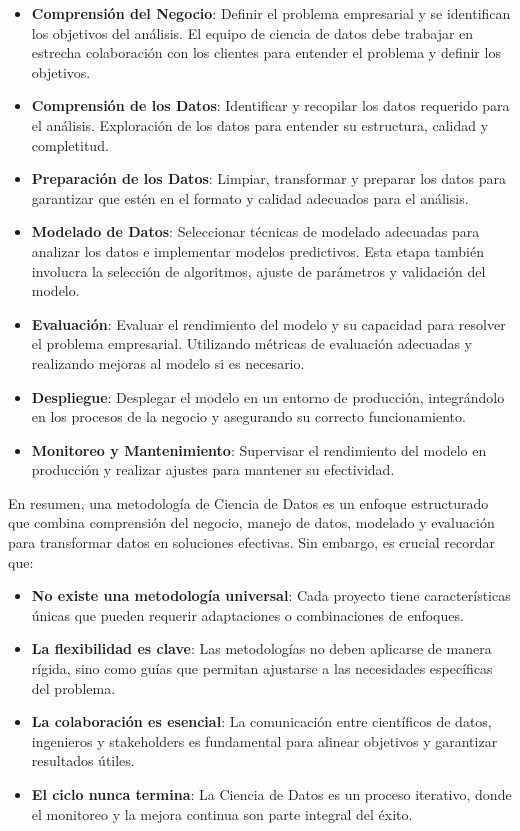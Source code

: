 \documentclass[12pt]{book}
\begin{document}
\begin{itemize}
    \item \textbf{Comprensión del Negocio}: Definir el problema empresarial y se identifican los objetivos del análisis. El equipo de ciencia de datos debe trabajar en estrecha colaboración con los clientes para entender el problema y definir los objetivos.
    \item \textbf{Comprensión de los Datos}: Identificar y recopilar los datos requerido para el análisis. Exploración de los datos para entender su estructura, calidad y completitud.
    \item \textbf{Preparación de los Datos}: Limpiar, transformar y preparar los datos para garantizar que estén en el formato y calidad adecuados para el análisis.
    \item \textbf{Modelado de Datos}: Seleccionar técnicas de modelado adecuadas para analizar los datos e implementar modelos predictivos. Esta etapa también involucra la selección de algoritmos, ajuste de parámetros y validación del modelo.
    \item \textbf{Evaluación}: Evaluar el rendimiento del modelo y su capacidad para resolver el problema empresarial. Utilizando métricas de evaluación adecuadas y realizando mejoras al modelo si es necesario.
    \item \textbf{Despliegue}: Desplegar el modelo en un entorno de producción, integrándolo en los procesos de la negocio y asegurando su correcto funcionamiento.
    \item \textbf{Monitoreo y Mantenimiento}: Supervisar el rendimiento del modelo en producción y realizar ajustes para mantener su efectividad.
\end{itemize}

En resumen, una metodología de Ciencia de Datos es un enfoque estructurado que combina comprensión del negocio, manejo de datos, modelado y evaluación para transformar datos en soluciones efectivas. Sin embargo, es crucial recordar que:

\begin{itemize}
    \item \textbf{No existe una metodología universal}: Cada proyecto tiene características únicas que pueden requerir adaptaciones o combinaciones de enfoques.
    \item \textbf{La flexibilidad es clave}: Las metodologías no deben aplicarse de manera rígida, sino como guías que permitan ajustarse a las necesidades específicas del problema.
    \item \textbf{La colaboración es esencial}: La comunicación entre científicos de datos, ingenieros y stakeholders es fundamental para alinear objetivos y garantizar resultados útiles.
    \item \textbf{El ciclo nunca termina}: La Ciencia de Datos es un proceso iterativo, donde el monitoreo y la mejora continua son parte integral del éxito.
\end{itemize}
\end{document}

